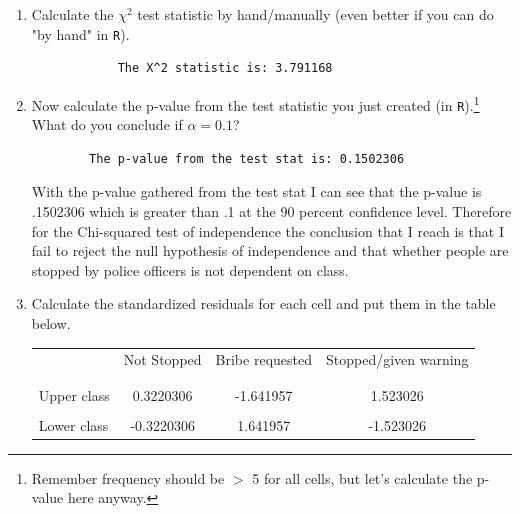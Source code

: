 \documentclass[12pt,letterpaper]{article}
\begin{document}
\begin{enumerate}
	
	\item [(a)]
	Calculate the $\chi^2$ test statistic by hand/manually (even better if you can do "by hand" in \texttt{R}).\\
		  
		\begin{verbatim}
			The X^2 statistic is: 3.791168
		\end{verbatim}
	\vspace{7cm}
	\item [(b)]
	Now calculate the p-value from the test statistic you just created (in \texttt{R}).\footnote{Remember frequency should be $>$ 5 for all cells, but let's calculate the p-value here anyway.}  What do you conclude if $\alpha = 0.1$?\\
		  
		\begin{verbatim}
		The p-value from the test stat is: 0.1502306
	\end{verbatim}
	With the p-value gathered from the test stat I can see that the p-value is .1502306 which is greater than .1 at the 90 percent confidence level. Therefore for the Chi-squared test of independence the conclusion that I reach is that I fail to reject the null hypothesis of independence and that whether people are stopped by police officers is not dependent on class.
	\newpage
	\item [(c)] Calculate the standardized residuals for each cell and put them in the table below.
	\vspace{1cm}
	
	\begin{table}[h]
		\centering
		\begin{tabular}{l | c c c }
			& Not Stopped & Bribe requested & Stopped/given warning \\
			\\[-1.8ex] 
			\hline \\[-1.8ex]
			Upper class  & 0.3220306 & -1.641957  & 1.523026  \\
			\\
			Lower class & -0.3220306  & 1.641957  & -1.523026   \\
			
		\end{tabular}
	\end{table}
		  
	

\end{enumerate}
\end{document}
